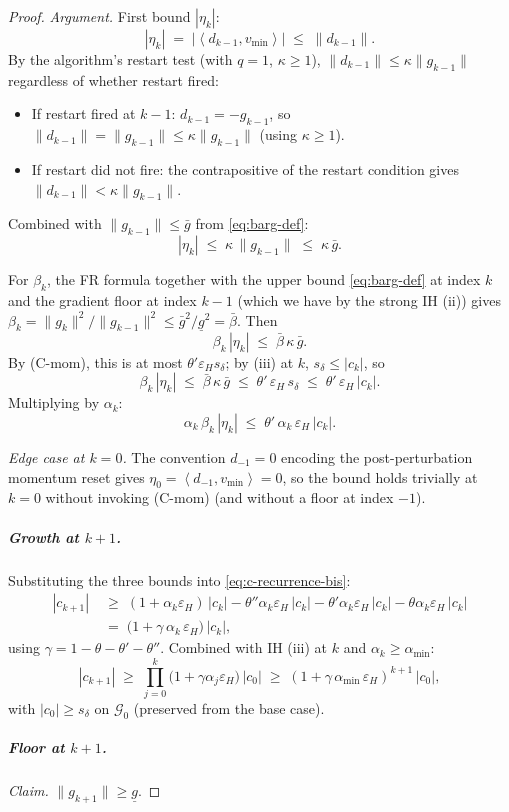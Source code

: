\documentclass[11pt,a4paper]{article}
\theoremstyle{plain}
\theoremstyle{definition}
\newcommand{\inner}[2]{\left\langle #1,#2 \right\rangle}
\newcommand{\eps}{\varepsilon}
\newcommand{\epsH}{\eps_{H}}
\newcommand{\vmin}{v_{\min}}
\newcommand{\sdel}{s_{\delta}}
\newcommand{\glow}{\underline{g}}
\newcommand{\gup}{\bar g}
\newcommand{\bbeta}{\bar\beta}
\newcommand{\amin}{\alpha_{\min}}
\begin{document}
\begin{proof}
\emph{Argument.} First bound $|\eta_k|$:
\[
|\eta_k| \;=\; |\inner{d_{k-1}}{\vmin}| \;\le\; \|d_{k-1}\|.
\]
By the algorithm's restart test (with $q = 1$, $\kappa \ge 1$),
$\|d_{k-1}\| \le \kappa\|g_{k-1}\|$ regardless of whether restart fired:
\begin{itemize}
\item If restart fired at $k-1$: $d_{k-1} = -g_{k-1}$, so $\|d_{k-1}\| = \|g_{k-1}\| \le \kappa\|g_{k-1}\|$ (using $\kappa \ge 1$).
\item If restart did not fire: the contrapositive of the restart condition gives $\|d_{k-1}\| < \kappa\|g_{k-1}\|$.
\end{itemize}
Combined with $\|g_{k-1}\| \le \gup$ from \eqref{eq:barg-def}:
\[
|\eta_k| \;\le\; \kappa\,\|g_{k-1}\| \;\le\; \kappa\,\gup.
\]

For $\beta_k$, the FR formula together with the upper bound
\eqref{eq:barg-def} at index $k$ and the gradient floor at index $k-1$ (which
we have by the strong IH (ii)) gives
$\beta_k = \|g_k\|^2/\|g_{k-1}\|^2 \le \gup^2/\glow^2 = \bbeta$.
Then
\[
\beta_k\,|\eta_k| \;\le\; \bbeta\,\kappa\,\gup.
\]
By (C-mom), this is at most $\theta'\epsH \sdel$; by (iii) at $k$,
$\sdel \le |c_k|$, so
\[
\beta_k\,|\eta_k| \;\le\; \bbeta\,\kappa\,\gup \;\le\; \theta'\,\epsH\,\sdel \;\le\; \theta'\,\epsH\,|c_k|.
\]
Multiplying by $\alpha_k$:
\[
\alpha_k\,\beta_k\,|\eta_k| \;\le\; \theta'\,\alpha_k\,\epsH\,|c_k|.
\]

\emph{Edge case at $k = 0$.} The convention $d_{-1} = 0$ encoding the
post-perturbation momentum reset gives $\eta_0 = \inner{d_{-1}}{\vmin} = 0$,
so the bound holds trivially at $k=0$ without invoking (C-mom) (and without a
floor at index $-1$).

\subparagraph{Growth at $k+1$.}
Substituting the three bounds into \eqref{eq:c-recurrence-bis}:
\begin{align*}
|c_{k+1}|
&\;\ge\; (1+\alpha_{k}\epsH)\,|c_k|
   - \theta''\alpha_{k}\epsH\,|c_k|
   - \theta'\alpha_{k}\epsH\,|c_k|
   - \theta\alpha_{k}\epsH\,|c_k| \\
&\;=\; \bigl(1 + \gamma\,\alpha_{k}\,\epsH\bigr)\,|c_k|,
\end{align*}
using $\gamma = 1 - \theta - \theta' - \theta''$. Combined with IH (iii) at
$k$ and $\alpha_{k}\ge\amin$:
\[
|c_{k+1}|
\;\ge\; \prod_{j=0}^{k}\bigl(1+\gamma\alpha_{j}\epsH\bigr)\,|c_0|
\;\ge\; (1 + \gamma\,\amin\,\epsH)^{k+1}\,|c_0|,
\]
with $|c_0| \ge \sdel$ on $\mathcal{G}_0$ (preserved from the base case).

\subparagraph{Floor at $k+1$.}
\emph{Claim.} $\|g_{k+1}\| \ge \glow$.


\end{proof}
\end{document}
